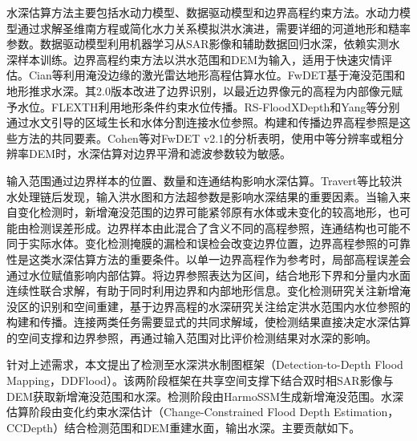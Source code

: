 \documentclass[authoryear,preprint,12pt]{elsarticle}
\begin{document}
水深估算方法主要包括水动力模型、数据驱动模型和边界高程约束方法。水动力模型通过求解圣维南方程或简化水力关系模拟洪水演进，需要详细的河道地形和糙率参数\citep{teng2017floodInundationUncertainty}。数据驱动模型利用机器学习从SAR影像和辅助数据回归水深，依赖实测水深样本训练\citep{chu2025urbanDepth}。边界高程约束方法以洪水范围和DEM为输入，适用于快速灾情评估。Cian等利用淹没边缘的激光雷达地形高程估算水位\citep{cian2018flood}。FwDET基于淹没范围和地形推求水深\citep{cohen2018estimating}。其2.0版本改进了边界识别，以最近边界像元的高程为内部像元赋予水位\citep{cohen2019floodwater}。FLEXTH利用地形条件约束水位传播\citep{betterle2024water}。RS-FloodXDepth和Yang等分别通过水文引导的区域生长和水体分割连接水位参照\citep{tian2026floodxdepth,yang2026csmamba}。构建和传播边界高程参照是这些方法的共同要素。Cohen等对FwDET v2.1的分析表明，使用中等分辨率或粗分辨率DEM时，水深估算对边界平滑和滤波参数较为敏感\citep{cohen2022sensitivity}。

输入范围通过边界样本的位置、数量和连通结构影响水深估算。Travert等比较洪水处理链后发现，输入洪水图和方法超参数是影响水深结果的重要因素\citep{travert2026uncertainty}。当输入来自变化检测时，新增淹没范围的边界可能紧邻原有水体或未变化的较高地形，也可能由检测误差形成。边界样本由此混合了含义不同的高程参照，连通结构也可能不同于实际水体。变化检测掩膜的漏检和误检会改变边界位置，边界高程参照的可靠性是这类水深估算方法的重要条件。以单一边界高程作为参考时，局部高程误差会通过水位赋值影响内部估算。将边界参照表达为区间，结合地形下界和分量内水面连续性联合求解，有助于同时利用边界和内部地形信息。变化检测研究关注新增淹没区的识别和空间重建，基于边界高程的水深研究关注给定洪水范围内水位参照的构建和传播。连接两类任务需要显式的共同求解域，使检测结果直接决定水深估算的空间支撑和边界参照，再通过输入范围对比评价检测结果对水深的影响。

针对上述需求，本文提出了检测至水深洪水制图框架（Detection-to-Depth Flood Mapping，DDFlood）。该两阶段框架在共享空间支撑下结合双时相SAR影像与DEM获取新增淹没范围和水深。检测阶段由HarmoSSM生成新增淹没范围。水深估算阶段由变化约束水深估计（Change-Constrained Flood Depth Estimation，CCDepth）结合检测范围和DEM重建水面，输出水深。主要贡献如下。
\end{document}
